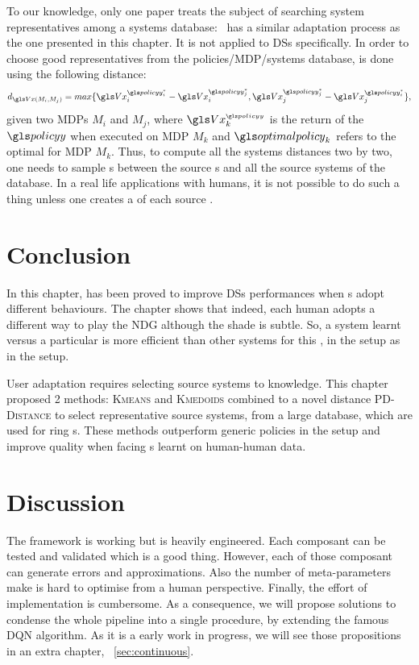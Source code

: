 To our knowledge, only one paper treats the subject of searching system representatives among a systems database:~\parencite{mahmud2013} has a similar adaptation process as the one presented in this chapter. It is not applied to \glspl{DS} specifically. In order to choose good representatives from the policies/MDP/systems database,  is done using the following distance:
\begin{equation*}
    d_{\V(M_i,M_j)} = max\{\V_i^{\policy_i^*}-\V_i^{\policy_j^*},\V_j^{\policy_j^*}-\V_j^{\policy_i^*}\},
\end{equation*}
given two \glspl{MDP} $M_i$ and $M_j$, where $\V_k^{_{\policy}}$ is the return of the  $\policy$ when executed on \gls{MDP} $M_k$ and $\optimalpolicy_k$ refers to the optimal  for \gls{MDP} $M_k$. Thus, to compute all the systems distances two by two, one needs to sample s between the source s and all the source systems of the database. In a real life  applications with humans, it is not possible to do such a thing unless one creates a  of each source .

\section{Conclusion}
%

In this chapter,  has been proved to improve \glspl{DS} performances when s adopt different behaviours. The chapter shows that indeed, each human adopts a different way to play the \gls{NDG} although the shade is subtle. So, a system learnt versus a particular  is more efficient than other systems for this , in the  setup as in the  setup.

User adaptation requires selecting source systems to  knowledge. This chapter proposed 2 methods: \textsc{Kmeans} and \textsc{Kmedoids} combined to a novel distance \textsc{PD-Distance} to select representative source systems, from a large database, which are used for ring  s. These methods outperform generic policies in the  setup and improve  quality when facing s learnt on human-human data.

\section{Discussion}

The framework is working but is heavily engineered. Each composant can be tested and validated which is a good thing. However, each of those composant can generate errors and approximations. Also the number of meta-parameters make is hard to optimise from a human perspective. Finally, the effort of implementation is cumbersome. As a consequence, we will propose solutions to condense the whole pipeline into a single procedure, by extending the famous \gls{DQN} algorithm. As it is a early work in progress, we will see those propositions in an extra chapter, ~\cref{sec:continuous}.
